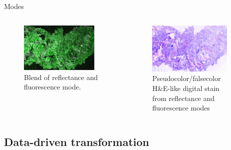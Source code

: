 \documentclass[t]{beamer}
\begin{document}
\begin{frame}{Modes}
{\begin{columns}
\begin{column}{0.5\textwidth}
\begin{figure}
\centering
\includegraphics[width=0.9\textwidth]{CM-blend}
\caption{Blend of reflectance and fluorescence mode.}
\end{figure}
\end{column}

\begin{column}{0.5\textwidth}
\begin{figure}
\centering
\includegraphics[width=0.9\textwidth]{CM-pseudocolor}
\caption{Pseudocolor/falsecolor H\&E-like digital stain from reflectance and fluorescence modes}
\end{figure}
\end{column}
\end{columns}
}


\end{frame}

\subsection{Data-driven transformation}
\end{document}
